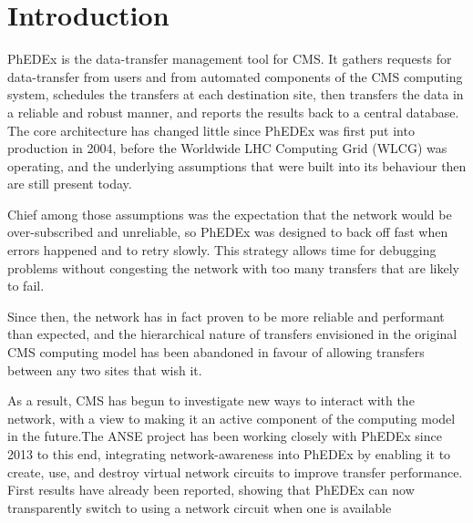 \section{Introduction}

PhEDEx\cite{PhEDEx} is the data-transfer management tool for CMS. It gathers requests for data-transfer from users and from automated components of the CMS computing system, schedules the transfers at each destination site, then transfers the data in a reliable and robust manner, and reports the results back to a central database. The core architecture has changed little since PhEDEx was first put into production in 2004, before the Worldwide LHC Computing Grid (WLCG\cite{WLCG}) was operating, and the underlying assumptions that were built into its behaviour then are still present today.

Chief among those assumptions was the expectation that the network would be over-subscribed and unreliable, so PhEDEx was designed to back off fast when errors happened and to retry slowly. This strategy allows time for debugging problems without congesting the network with too many transfers that are likely to fail.

Since then, the network has in fact proven to be more reliable and performant than expected, and the hierarchical nature of transfers envisioned in the original CMS computing model\cite{CompModel} has been abandoned in favour of allowing transfers between any two sites that wish it\cite{T2Traffic}.

As a result, CMS has begun to investigate new ways to interact with the network, with a view to making it an active component of the computing model in the future\cite{NetworkAwarenessinCMS}.The ANSE project\cite{ANSE} has been working closely with PhEDEx since 2013 to this end, integrating network-awareness into PhEDEx by enabling it to create, use, and destroy virtual network circuits to improve transfer performance. First results have already been reported, showing that PhEDEx can now transparently switch to using a network circuit when one is available\cite{ANSE_ISGC_2014}